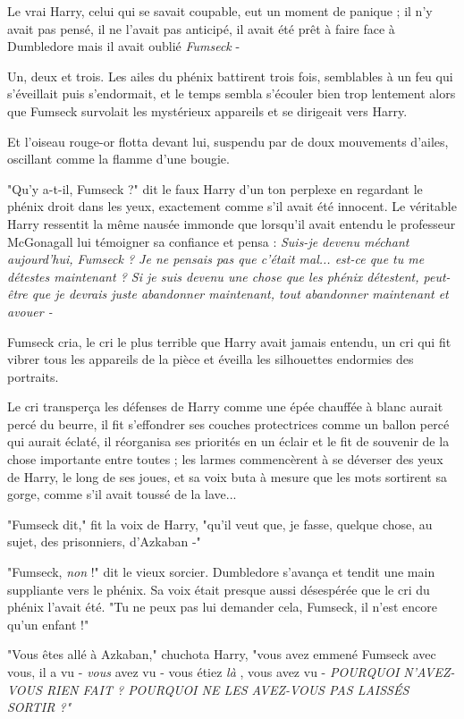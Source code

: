 Le vrai Harry, celui qui se savait coupable, eut un moment de panique ; il n'y avait pas pensé, il ne l'avait pas anticipé, il avait été prêt à faire face à Dumbledore mais il avait oublié \emph{Fumseck}  -

Un, deux et trois. Les ailes du phénix battirent trois fois, semblables à un feu qui s'éveillait puis s'endormait, et le temps sembla s'écouler bien trop lentement alors que Fumseck survolait les mystérieux appareils et se dirigeait vers Harry.

Et l'oiseau rouge-or flotta devant lui, suspendu par de doux mouvements d'ailes, oscillant comme la flamme d'une bougie.

"Qu'y a-t-il, Fumseck ?" dit le faux Harry d'un ton perplexe en regardant le phénix droit dans les yeux, exactement comme s'il avait été innocent. Le véritable Harry ressentit la même nausée immonde que lorsqu'il avait entendu le professeur McGonagall lui témoigner sa confiance et pensa : \emph{Suis-je devenu méchant aujourd'hui, Fumseck ? Je ne pensais pas que c'était mal... est-ce que tu me détestes maintenant ? Si je suis devenu une chose que les phénix détestent, peut-être que je devrais juste abandonner maintenant, tout abandonner maintenant et avouer -} 

Fumseck cria, le cri le plus terrible que Harry avait jamais entendu, un cri qui fit vibrer tous les appareils de la pièce et éveilla les silhouettes endormies des portraits.

Le cri transperça les défenses de Harry comme une épée chauffée à blanc aurait percé du beurre, il fit s'effondrer ses couches protectrices comme un ballon percé qui aurait éclaté, il réorganisa ses priorités en un éclair et le fit de souvenir de la chose importante entre toutes ; les larmes commencèrent à se déverser des yeux de Harry, le long de ses joues, et sa voix buta à mesure que les mots sortirent sa gorge, comme s'il avait toussé de la lave...

"Fumseck dit," fit la voix de Harry, "qu'il veut que, je fasse, quelque chose, au sujet, des prisonniers, d'Azkaban -"

"Fumseck, \emph{non}  !" dit le vieux sorcier. Dumbledore s'avança et tendit une main suppliante vers le phénix. Sa voix était presque aussi désespérée que le cri du phénix l'avait été. "Tu ne peux pas lui demander cela, Fumseck, il n'est encore qu'un enfant !"

"Vous êtes allé à Azkaban," chuchota Harry, "vous avez emmené Fumseck avec vous, il a vu - \emph{vous}  avez vu - vous étiez \emph{là} , vous avez vu - \emph{POURQUOI N'AVEZ-VOUS RIEN FAIT ? POURQUOI NE LES AVEZ-VOUS PAS LAISSÉS SORTIR ?"} 

